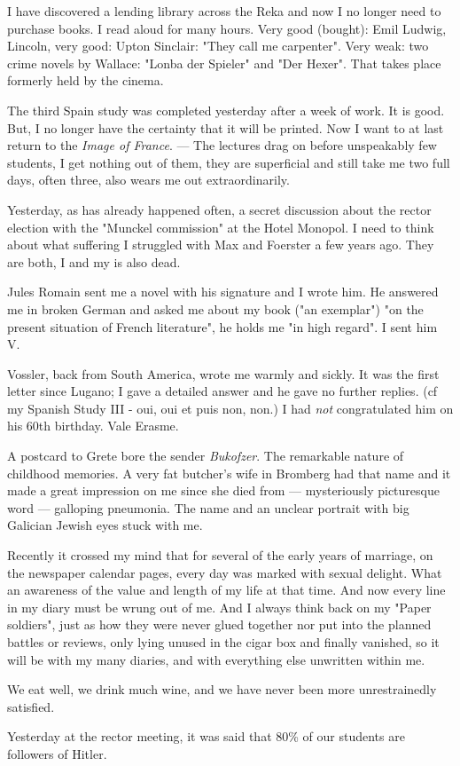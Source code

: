 \missing

I have discovered a lending library across the Reka and now I no longer need to purchase books. I read aloud for many hours. Very good (bought): Emil Ludwig, Lincoln, very good: Upton Sinclair: "They call me carpenter". Very weak: two crime novels by Wallace: "Lonba der Spieler" and "Der Hexer". That takes place formerly held by the cinema.

The third Spain study was completed yesterday after a week of work. It is good. But, I no longer have the certainty that it will be printed. Now I want to at last return to the \textit{Image of France}. — The lectures drag on before unspeakably few students, I get nothing out of them, they are superficial and still take me two full days, often three, also wears me out extraordinarily.

Yesterday, as has already happened often, a secret discussion about the rector election with the "Munckel commission" at the Hotel Monopol. I need to think about what suffering I struggled with Max and Foerster a few years ago. They are both, I  and my  is also dead.

Jules Romain sent me a novel with his signature and I wrote him. He answered me in broken German and asked me about my book ("an exemplar") "on the present situation of French literature", he holds me "in high regard". I sent him V.

Vossler, back from South America, wrote me warmly and sickly. It was the first letter since Lugano; I gave a detailed answer and he gave no further replies. (cf my Spanish Study III - oui, oui et puis non, non.) I had \textit{not} congratulated him on his 60th birthday. Vale Erasme.

A postcard to Grete bore the sender \textit{Bukofzer}. The remarkable nature of childhood memories. A very fat butcher's wife in Bromberg had that name and it made a great impression on me since she died from — mysteriously picturesque word — galloping pneumonia. The name and an unclear portrait with big Galician Jewish eyes stuck with me. \missing

Recently it crossed my mind that for several of the early years of marriage, on the newspaper calendar pages, every day was marked with sexual delight. What an awareness of the value and length of my life at that time. And now every line in my diary must be wrung out of me. And I always think back on my "Paper soldiers", just as how they were never glued together nor put into the planned battles or reviews, only lying unused in the cigar box and finally vanished, so it will be with my many diaries, and with everything else unwritten within me.

We eat well, we drink much wine, and we have never been more unrestrainedly satisfied.

Yesterday at the rector meeting, it was said that 80\% of our students are followers of Hitler.